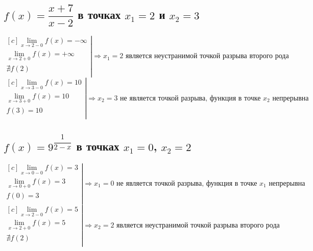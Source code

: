 \documentclass[12pt]{article}
\begin{document}
\begin{sloppypar}
    \subsection{$f(x) = \dfrac{x + 7}{x - 2}$ в точках $x_1 = 2$ и $x_2 = 3$}
    \[
        \left.\begin{aligned}[c]
            \lim_{x \rightarrow 2 - 0} f(x) = -\infty \\
            \lim_{x \rightarrow 2 + 0} f(x) = +\infty \\
            \nexists f(2)                             \\
        \end{aligned}\right|
        \Rightarrow x_1 = 2 \text{ является неустранимой точкой разрыва второго рода}
    \]
    \[
        \left.\begin{aligned}[c]
            \lim_{x \rightarrow 3 - 0} f(x) = 10 \\
            \lim_{x \rightarrow 3 + 0} f(x) = 10 \\
            f(3) = 10                            \\
        \end{aligned}\right|
        \Rightarrow
        x_2 = 3 \text{ не является точкой разрыва, функция в точке $x_2$ непрерывна}
    \]

    \subsection{$f(x) = 9^{\dfrac{1}{2 - x}}$ в точках $x_1 = 0$, $x_2 = 2$}
    \[
        \left.\begin{aligned}[c]
            \lim_{x \rightarrow 0 - 0} f(x) = 3 \\
            \lim_{x \rightarrow 0 + 0} f(x) = 3 \\
            f(0) = 3                            \\
        \end{aligned}\right|
        \Rightarrow x_1 = 0 \text{ не является точкой разрыва, функция в точке $x_1$ непрерывна}
    \]
    \[
        \left.\begin{aligned}[c]
            \lim_{x \rightarrow 2 - 0} f(x) = 5 \\
            \lim_{x \rightarrow 2 + 0} f(x) = 5 \\
            \nexists f(2)                       \\
        \end{aligned}\right|
        \Rightarrow
        x_2 = 2 \text{ является неустранимой точкой разрыва второго рода}
    \]


\end{sloppypar}
\end{document}

